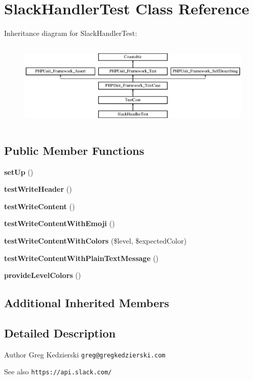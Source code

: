 \section{Slack\+Handler\+Test Class Reference}
\label{class_monolog_1_1_handler_1_1_slack_handler_test}
Inheritance diagram for Slack\+Handler\+Test\+:\begin{figure}[H]
\begin{center}
\leavevmode
\includegraphics[height=4.129793cm]{class_monolog_1_1_handler_1_1_slack_handler_test}
\end{center}
\end{figure}
\subsection*{Public Member Functions}
\begin{DoxyCompactItemize}
\item 
{\bf set\+Up} ()
\item 
{\bf test\+Write\+Header} ()
\item 
{\bf test\+Write\+Content} ()
\item 
{\bf test\+Write\+Content\+With\+Emoji} ()
\item 
{\bf test\+Write\+Content\+With\+Colors} (\$level, \$expected\+Color)
\item 
{\bf test\+Write\+Content\+With\+Plain\+Text\+Message} ()
\item 
{\bf provide\+Level\+Colors} ()
\end{DoxyCompactItemize}
\subsection*{Additional Inherited Members}


\subsection{Detailed Description}
\begin{DoxyAuthor}{Author}
Greg Kedzierski {\tt greg@gregkedzierski.\+com} 
\end{DoxyAuthor}
\begin{DoxySeeAlso}{See also}
{\tt https\+://api.\+slack.\+com/} 
\end{DoxySeeAlso}



